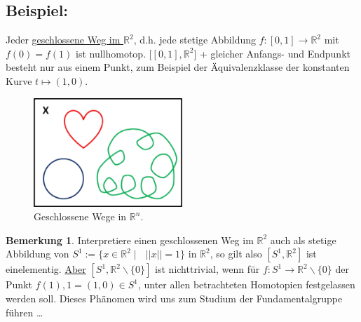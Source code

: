 \documentclass[a4paper,11pt,notitlepage]{report}
\theoremstyle{definition}
\newtheorem{remark}{Bemerkung}[chapter]
\newcommand{\R}{{\ensuremath{\mathbb{R}}}}
\newenvironment{bsp}[1]
{
\setlength{\fboxsep}{10pt}
\subsection*{Beispiel: #1}
\begin{upshape}
}
{
\end{upshape}
}
\begin{document}
\begin{bsp}{}
Jeder \underline{geschlossene Weg im $\R^2$}, d.h. jede stetige Abbildung $f \colon [0,1] \rightarrow \R^2$ mit $f(0) = f(1)$ ist nullhomotop.
$\bigl[[0,1], \R^2\bigr]$ + gleicher Anfangs- und Endpunkt besteht nur aus einem Punkt, zum Beispiel der Äquivalenzklasse der konstanten Kurve $t \mapsto (1,0)$.

\begin{figure}[h]
\centering
\includegraphics[width=0.5\textwidth]{images/Geschlossene_Wege.png}
\caption{Geschlossene Wege in $\R^n$.}
\end{figure}

\begin{remark}{}\label{nichttrivial}
Interpretiere einen geschlossenen Weg im $\R^2$ auch als stetige Abbildung von $S^1 := \{ x \in \R^2 \mid \text{ } ||x|| = 1\}$ in $\R^2$, so gilt also $[S^1, \R^2]$ ist einelementig.
\newline
\underline{Aber} $[S^1, \R^2 \backslash \{0\}]$ ist nichttrivial, wenn für $f \colon S^1 \rightarrow \R^2 \backslash \{0\}$ der Punkt $f(1), 1 = (1,0) \in S^1$, unter allen betrachteten Homotopien festgelassen werden soll. Dieses Phänomen wird uns zum Studium der Fundamentalgruppe führen \ldots
\end{remark}


\end{bsp}
\end{document}
